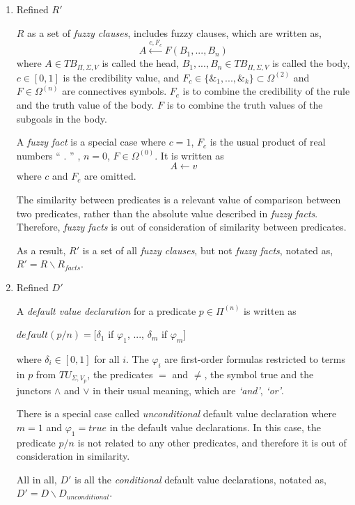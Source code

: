 \begin{enumerate}
 \item Refined $R'$

    $R$ as a set of \textit{fuzzy clauses}, includes fuzzy clauses, which are written as, \[A \stackrel{c,F_c}{\longleftarrow}F(B_1,...,B_n)\]
    where $A \in TB_{\Pi,\Sigma,V}$ is called the head, $B_1,...,B_n \in TB_{\Pi,\Sigma,V}$ is called the body, $c\in[0,1]$ is the credibility value, and $F_c\in\{\&_1,...,\&_k\}\subset\Omega^{(2)}$ and $F\in\Omega^{(n)}$ are connectives symbols. $F_c$ is to combine the credibility of the rule and the truth value of the body. $F$ is to combine the truth values of the subgoals in the body.
   
    A \textit{fuzzy fact} is a special case where $c=1$, $F_c$ is the usual product of real numbers  `` . ''  , $n=0$, $F\in\Omega^{(0)}$. It is written as \[A \longleftarrow v\]
    where $c$ and $F_c$ are omitted. 

    The similarity between predicates is a relevant value of comparison between two predicates, rather than the absolute value described in \textit{fuzzy facts}. Therefore, \textit{fuzzy facts} is out of consideration of similarity between predicates.
    
    As a result, $R'$ is a set of all \textit{fuzzy clauses}, but not \textit{fuzzy facts}, notated as, $R'=R\backslash R_{facts}$.
 \item Refined $D'$

    A \textit{default value declaration} for a predicate $p \in \Pi ^{(n)}$ is written as 
    \begin{center}
       $default(p/n)=[\delta_1$ if $\varphi_1$, ..., $\delta_m$ if $\varphi_m]$
    \end{center}
    where $\delta_i\in[0,1]$ for all $i$. The $\varphi_i$ are first-order formulas restricted to terms in $p$ from $TU_{\Sigma,V_p}$, the predicates $=$ and $\neq$, the symbol true and the junctors $\wedge$ and $\vee$ in their usual meaning, which are \textit{`and'}, \textit{ `or'}.

    There is a special case called \textit{unconditional} default value declaration where $m=1$ and $\varphi_1=true$ in the default value declarations. In this case, the predicate $p/n$ is not related to any other predicates,  and therefore it is out of consideration in similarity.

    All in all, $D'$ is all the \textit{conditional} default value declarations, notated as, $D'=D\backslash D_{unconditional}$.


\end{enumerate}
